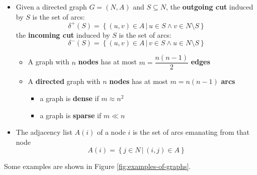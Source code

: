 \documentclass[english]{article}
\begin{document}
\begin{itemize}
  \item Given a directed graph \(G = (N, A)\) and \(S \subseteq N\), the \textbf{outgoing cut} induced by \(S\) is the set of arcs:
        \[\delta^+(S) = \left\{ (u, v) \in A \,|\, u \in S \land v \in N \setminus S \right\}\]
        the \textbf{incoming cut} induced by \(S\) is the set of arcs:
        \[\delta^-(S) = \left\{ (u, v) \in A \,|\, v \in S \land u \in N \setminus S \right\}\]
        \begin{itemize}
          \item A graph with \(n\) \textbf{nodes} has at most \(m = \dfrac{n(n-1)}{2}\) \textbf{edges}
          \item A \textbf{directed} graph with \(n\) \textbf{nodes} has at most \(m = n(n-1)\) \textbf{arcs}
                \begin{itemize}
                  \item a graph is \textbf{dense} if \(m \approx n^2\)
                  \item a graph is \textbf{sparse} if \(m \ll n\)
                \end{itemize}
        \end{itemize}
  \item The adjacency list \(A(i)\) of a node \(i\) is the set of arcs emanating from that node
        \[ A(i) = \left\{ j \in N \, | \, (i, j) \in A  \right\} \]
\end{itemize}

\bigskip
Some examples are shown in Figure \ref{fig:examples-of-graphs}.
\end{document}
